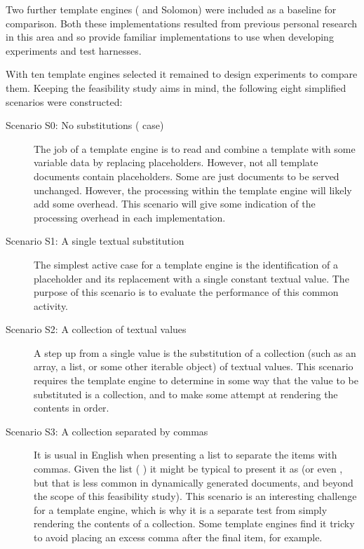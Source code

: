 Two further template engines (\cite{Stringtree2018} and Solomon) were included as a baseline for comparison. Both these implementations resulted from previous personal research in this area and so provide familiar implementations to use when developing experiments and test harnesses.

With ten template engines selected it remained to design experiments to compare them. Keeping the feasibility study aims in mind, the following eight simplified  scenarios were constructed:

\begin{description}
\item[Scenario S0: No substitutions ( case)] \hfill

The job of a template engine is to read and combine a template with some variable data by replacing placeholders. However, not all template documents contain placeholders. Some are just documents to be served unchanged. However, the processing within the template engine will likely add some overhead. This scenario will give some indication of the processing overhead in each implementation.

\item[Scenario S1: A single textual substitution] \hfill

The simplest active case for a template engine is the identification of a placeholder and its replacement with a single constant textual value. The purpose of this scenario is to evaluate the performance of this common activity.

\item[Scenario S2: A collection of textual values] \hfill

A step up from a single value is the substitution of a collection (such as an array, a list, or some other iterable object) of textual values. This scenario requires the template engine to determine in some way that the value to be substituted is a collection, and to make some attempt at rendering the contents in order.

\item[Scenario S3: A collection separated by commas] \hfill

It is usual in English when presenting a list to separate the items with commas. Given the list (  ) it might be typical to present it as  (or even , but that is less common in dynamically generated documents, and beyond the scope of this feasibility study). This scenario is an interesting challenge for a template engine, which is why it is a separate test from simply rendering the contents of a collection. Some template engines find it tricky to avoid placing an excess comma after the final item, for example.


\end{description}

